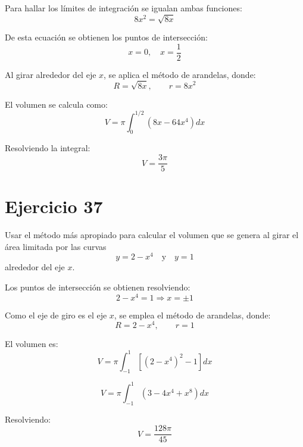 \documentclass[12pt]{article}
\begin{document}
Para hallar los límites de integración se igualan ambas funciones:
\[
8x^2 = \sqrt{8x}
\]

De esta ecuación se obtienen los puntos de intersección:
\[
x = 0, \quad x = \frac{1}{2}
\]

Al girar alrededor del eje $x$, se aplica el método de arandelas, donde:
\[
R = \sqrt{8x}, \qquad r = 8x^2
\]

El volumen se calcula como:
\[
V = \pi \int_{0}^{1/2} \left(8x - 64x^4\right) dx
\]

Resolviendo la integral:
\[
V = \frac{3\pi}{5}
\]

\section*{Ejercicio 37}
Usar el método más apropiado para calcular el volumen que se genera al girar el área limitada por las curvas
\[
y = 2 - x^4 \quad \text{y} \quad y = 1
\]
alrededor del eje $x$.

Los puntos de intersección se obtienen resolviendo:
\[
2 - x^4 = 1 \Rightarrow x = \pm 1
\]

Como el eje de giro es el eje $x$, se emplea el método de arandelas, donde:
\[
R = 2 - x^4, \qquad r = 1
\]

El volumen es:
\[
V = \pi \int_{-1}^{1} \left[(2 - x^4)^2 - 1\right] dx
\]

\[
V = \pi \int_{-1}^{1} (3 - 4x^4 + x^8) dx
\]

Resolviendo:
\[
V = \frac{128\pi}{45}
\]
\end{document}

